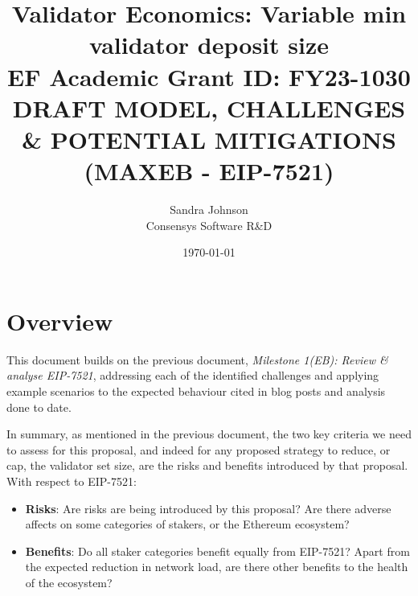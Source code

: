 \documentclass[UTF8]{article}
\title{Validator Economics: Variable min validator deposit size\\
\vspace{4pt}
\large EF Academic Grant ID: FY23-1030\\
\vspace{16pt}
DRAFT MODEL, CHALLENGES \& POTENTIAL MITIGATIONS\\
(MAXEB - EIP-7521) }
\author{Sandra Johnson\\
Consensys Software R\&D}
\date{\today}                                           %
\begin{document}
\maketitle



\section{Overview}
This document builds on the previous document, \textit{Milestone 1(EB): Review \& analyse EIP-7521}, addressing each of the identified challenges and applying example scenarios to the expected behaviour cited in blog posts and analysis done to date.

In summary, as mentioned in the previous document, the two key criteria we need to assess for this proposal, and indeed for any proposed strategy to reduce, or cap, the validator set size, are the risks and benefits introduced by that proposal. \\

\noindent
With respect to EIP-7521:
\begin{itemize}
\item \textbf{Risks}: Are risks are being introduced by this proposal? Are there adverse affects on some categories of stakers, or the Ethereum ecosystem?
\item  \textbf{Benefits}: Do all staker categories benefit equally from EIP-7521? Apart from the expected reduction in network load, are there other benefits to the health of the ecosystem?
\end{itemize}
\end{document}
